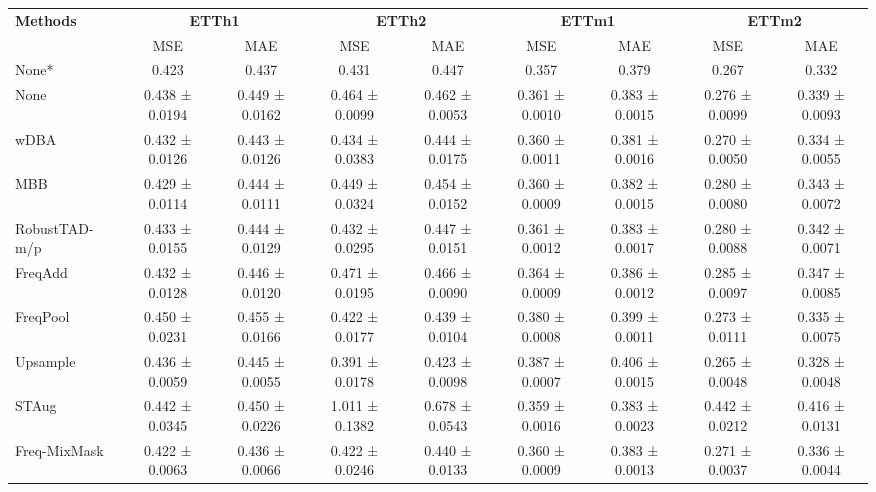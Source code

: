 \begin{table}[h!]
\centering
\vspace{0.2cm}
\renewcommand{\arraystretch}{1.3}
\begin{adjustbox}{max width=\textwidth}
\begin{tabular}{l|cc|cc|cc|cc}
    \toprule
    \textbf{Methods} & \multicolumn{2}{c|}{\textbf{ETTh1}} & \multicolumn{2}{c|}{\textbf{ETTh2}} & \multicolumn{2}{c|}{\textbf{ETTm1}} & \multicolumn{2}{c}{\textbf{ETTm2}} \\
    & MSE & MAE & MSE & MAE & MSE & MAE & MSE & MAE \\
    \midrule
    None*        & 0.423 & 0.437 & 0.431 & 0.447 & 0.357 & 0.379 & 0.267 & 0.332 \\
            None         & 0.438 ± 0.0194 & 0.449 ± 0.0162 & 0.464 ± 0.0099 & 0.462 ± 0.0053 & 0.361 ± 0.0010 & 0.383 ± 0.0015 & 0.276 ± 0.0099 & 0.339 ± 0.0093\\
        wDBA          & 0.432 ± 0.0126 & 0.443 ± 0.0126 & 0.434 ± 0.0383 & 0.444 ± 0.0175 & 0.360 ± 0.0011 & \cellcolor{secondcolor}0.381 ± 0.0016 & 0.270 ± 0.0050 & 0.334 ± 0.0055 \\
        MBB          & 0.429 ± 0.0114 & 0.444 ± 0.0111 & 0.449 ± 0.0324 & 0.454 ± 0.0152 & 0.360 ± 0.0009 & 0.382 ± 0.0015 & 0.280 ± 0.0080 & 0.343 ± 0.0072 \\
        RobustTAD-m/p  & 0.433 ± 0.0155 & 0.444 ± 0.0129 & 0.432 ± 0.0295 & 0.447 ± 0.0151 & 0.361 ± 0.0012 & 0.383 ± 0.0017 & 0.280 ± 0.0088 & 0.342 ± 0.0071 \\
        FreqAdd      & 0.432 ± 0.0128 & 0.446 ± 0.0120 & 0.471 ± 0.0195 & 0.466 ± 0.0090 & 0.364 ± 0.0009 & 0.386 ± 0.0012 & 0.285 ± 0.0097 & 0.347 ± 0.0085 \\
        FreqPool     & 0.450 ± 0.0231 & 0.455 ± 0.0166 & 0.422 ± 0.0177 & 0.439 ± 0.0104 & 0.380 ± 0.0008 & 0.399 ± 0.0011 & 0.273 ± 0.0111 & 0.335 ± 0.0075 \\
        Upsample     & 0.436 ± 0.0059 & 0.445 ± 0.0055 & \cellcolor{secondcolor}0.391 ± 0.0178 & \cellcolor{secondcolor}0.423 ± 0.0098 & 0.387 ± 0.0007 & 0.406 ± 0.0015 & \cellcolor{secondcolor}0.265 ± 0.0048 & \cellcolor{secondcolor}0.328 ± 0.0048  \\
        STAug        & 0.442 ± 0.0345 & 0.450 ± 0.0226 & 1.011 ± 0.1382 & 0.678 ± 0.0543 & \cellcolor{secondcolor}0.359 ± 0.0016 & 0.383 ± 0.0023 & 0.442 ± 0.0212 & 0.416 ± 0.0131  \\
        Freq-MixMask & 0.422 ± 0.0063 & 0.436 ± 0.0066 & 0.422 ± 0.0246 & 0.440 ± 0.0133 & 0.360 ± 0.0009 & 0.383 ± 0.0013 & 0.271 ± 0.0037 & 0.336 ± 0.0044 \\

\end{tabular}
\end{adjustbox}
\end{table}
